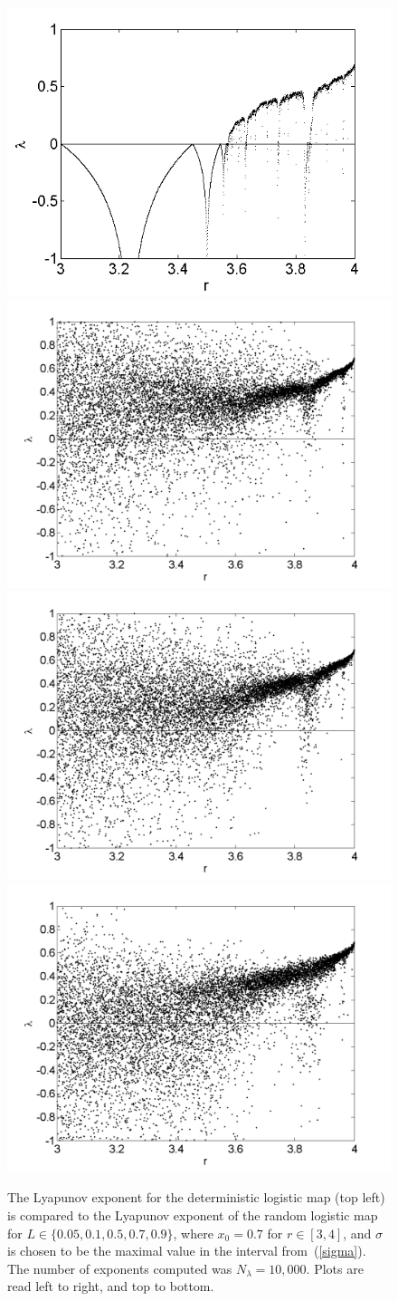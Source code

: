 \begin{figure}[!h]
\caption[Lyapunov exponent in the random logistic map compared to the
deterministic map, $\sigma=\sigma_{max}$]{The Lyapunov exponent for the deterministic
  logistic map (top left) is compared
  to the Lyapunov exponent of the random logistic map for $L \in
  \{0.05,0.1,0.5,0.7,0.9\}$, where $x_0=0.7$ for $r \in [3,4]$, and
  $\sigma$ is chosen to be the maximal value in the interval
  from~(\ref{sigma}). The number of exponents computed was $N_\lambda=10,000$. Plots are read left to right, and top to bottom. }\label{fig:rloglyap2}
\centering
\includegraphics[width=.5\textwidth]{figs/det_log_lyap.png}\hfill
\includegraphics[width=.5\textwidth]{figs/rlog_lyap_L_005.png}\\
\includegraphics[width=.5\textwidth]{figs/rlog_lyap_L_01.png}\hfill
\includegraphics[width=.5\textwidth]{figs/rlog_lyap_L_05.png}\\

\end{figure}
